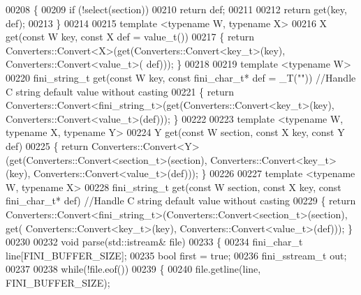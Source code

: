 \begin{DoxyCode}
00208    \{
00209       \textcolor{keywordflow}{if} (!select(section))
00210          \textcolor{keywordflow}{return} def;
00211 
00212       \textcolor{keywordflow}{return} \textcolor{keyword}{get}(key, def);
00213    \}
00214 
00215    \textcolor{keyword}{template} <\textcolor{keyword}{typename} W, \textcolor{keyword}{typename} X>
00216       X \textcolor{keyword}{get}(\textcolor{keyword}{const} W key, \textcolor{keyword}{const} X def = value\_t())
00217          \{ \textcolor{keywordflow}{return} Converters::Convert<X>(\textcolor{keyword}{get}(Converters::Convert<key\_t>(key), Converters::Convert<value\_t>(
      def))); \}
00218 
00219    \textcolor{keyword}{template} <\textcolor{keyword}{typename} W>
00220       fini_string_t \textcolor{keyword}{get}(\textcolor{keyword}{const} W key, \textcolor{keyword}{const} fini_char_t* def = _T(\textcolor{stringliteral}{""}))  \textcolor{comment}{//Handle C string default value
       without casting}
00221          \{ \textcolor{keywordflow}{return} Converters::Convert<fini\_string\_t>(\textcolor{keyword}{get}(Converters::Convert<key\_t>(key), 
      Converters::Convert<value\_t>(def))); \}
00222 
00223    \textcolor{keyword}{template} <\textcolor{keyword}{typename} W, \textcolor{keyword}{typename} X, \textcolor{keyword}{typename} Y>
00224       Y \textcolor{keyword}{get}(\textcolor{keyword}{const} W section, \textcolor{keyword}{const} X key, \textcolor{keyword}{const} Y def)
00225          \{ \textcolor{keywordflow}{return} Converters::Convert<Y>(\textcolor{keyword}{get}(Converters::Convert<section\_t>(section), 
      Converters::Convert<key\_t>(key), Converters::Convert<value\_t>(def))); \}
00226 
00227    \textcolor{keyword}{template} <\textcolor{keyword}{typename} W, \textcolor{keyword}{typename} X>
00228       fini_string_t \textcolor{keyword}{get}(\textcolor{keyword}{const} W section, \textcolor{keyword}{const} X key, \textcolor{keyword}{const} fini_char_t* def)  \textcolor{comment}{//Handle C string default
       value without casting}
00229          \{ \textcolor{keywordflow}{return} Converters::Convert<fini\_string\_t>(Converters::Convert<section\_t>(section), \textcolor{keyword}{get}(
      Converters::Convert<key\_t>(key), Converters::Convert<value\_t>(def))); \}
00230 
00232    \textcolor{keywordtype}{void} parse(std::istream& file)
00233    \{
00234       fini_char_t line[FINI_BUFFER_SIZE];
00235       \textcolor{keywordtype}{bool} first = \textcolor{keyword}{true};
00236       fini_sstream_t out;
00237 
00238       \textcolor{keywordflow}{while}(!file.eof())
00239       \{
00240          file.getline(line, FINI_BUFFER_SIZE);

\end{DoxyCode}
